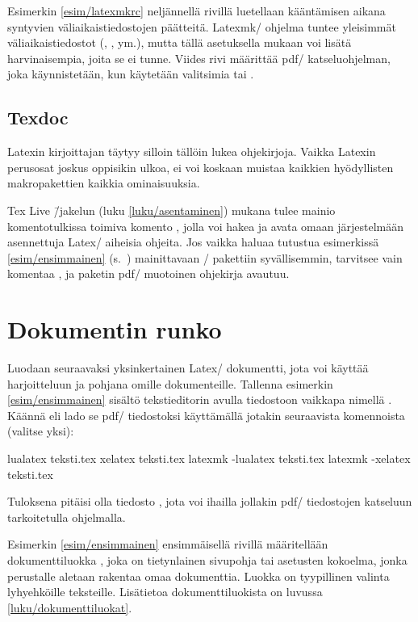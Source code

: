 Esimerkin \ref{esim/latexmkrc} neljännellä rivillä luetellaan
kääntämisen aikana syntyvien väliaikaistiedostojen päätteitä. Latexmk\-/
ohjelma tuntee yleisimmät väliaikaistiedostot (, ,
 ym.), mutta tällä asetuksella mukaan voi lisätä
harvinaisempia, joita se ei tunne. Viides rivi määrittää pdf\-/
katseluohjelman, joka käynnistetään, kun käytetään valitsimia
 tai .

\subsection{Texdoc}

Latexin kirjoittajan täytyy silloin tällöin lukea ohjekirjoja. Vaikka
Latexin perusosat joskus oppisikin ulkoa, ei voi koskaan muistaa
kaikkien hyödyllisten makropakettien kaikkia ominaisuuksia.

Tex Live \=/jakelun (luku \ref{luku/asentaminen}) mukana tulee mainio
komentotulkissa toimiva komento , jolla voi hakea ja avata
omaan järjestelmään asennettuja Latex\-/ aiheisia ohjeita. Jos vaikka
haluaa tutustua esimerkissä \ref{esim/ensimmainen}
(s.~\pageref{esim/ensimmainen}) mainittavaan \-/
pakettiin syvällisemmin, tarvitsee vain komentaa , ja paketin pdf\-/ muotoinen ohjekirja avautuu.

\section{Dokumentin runko}

Luodaan seuraavaksi yksinkertainen Latex\-/ dokumentti, jota voi käyttää
harjoitteluun ja pohjana omille dokumenteille. Tallenna esimerkin
\ref{esim/ensimmainen} sisältö tekstieditorin avulla tiedostoon vaikkapa
nimellä . Käännä eli lado se pdf\-/ tiedostoksi
käyttämällä jotakin seuraavista komennoista (valitse yksi):

\begin{koodilohkosis}
lualatex teksti.tex
xelatex  teksti.tex
latexmk -lualatex teksti.tex
latexmk -xelatex  teksti.tex
\end{koodilohkosis}

Tuloksena pitäisi olla tiedosto , jota voi ihailla
jollakin pdf\-/ tiedostojen katseluun tarkoitetulla ohjelmalla.

Esimerkin \ref{esim/ensimmainen} ensimmäisellä rivillä määritellään
dokumenttiluokka , joka on tietynlainen sivupohja tai
asetusten kokoelma, jonka perustalle aletaan rakentaa omaa dokumenttia.
Luokka  on tyypillinen valinta lyhyehköille teksteille.
Lisätietoa dokumenttiluokista on luvussa \ref{luku/dokumenttiluokat}.

